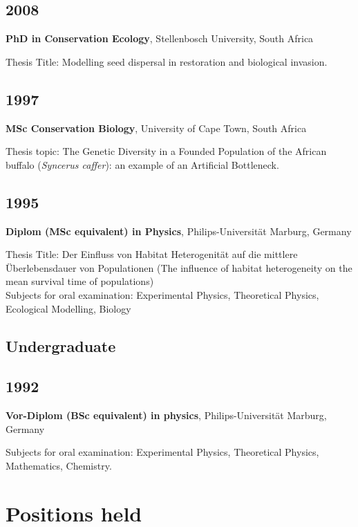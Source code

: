 \documentclass[a4paper]{article}
\begin{document}
\subsection{2008}

\textbf{PhD in Conservation Ecology}, Stellenbosch University, South Africa

Thesis Title: Modelling seed dispersal in restoration and biological
invasion.

\subsection{1997}

\textbf{MSc Conservation Biology}, University of Cape Town, South Africa

Thesis topic: The Genetic Diversity in a Founded Population of the
African buffalo (\emph{Syncerus caffer}): an example of an Artificial
Bottleneck.

\subsection{1995}

\textbf{Diplom (MSc equivalent) in Physics}, Philips-Universität Marburg, Germany

Thesis Title: Der Einfluss von Habitat Heterogenität auf die mittlere
Überlebensdauer von Populationen (The influence of habitat heterogeneity
on the mean survival time of populations)\\
Subjects for oral examination: Experimental Physics, Theoretical
Physics, Ecological Modelling, Biology

\subsection{Undergraduate}



\subsection{1992}

\textbf{Vor-Diplom (BSc equivalent) in physics}, Philips-Universität Marburg, Germany

Subjects for oral examination: Experimental Physics, Theoretical Physics, Mathematics, Chemistry.

\section{Positions held}
\end{document}
